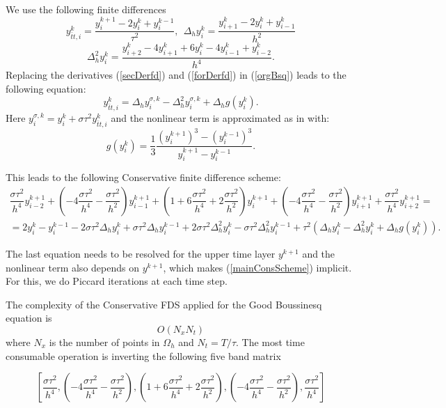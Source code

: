 \documentclass[%
 aip,
cp,  
 amsmath,amssymb,
 reprint,
]{iopconfser}
\newcommand{\rf}[1]{(\ref{#1})}
\begin{document}
We use the following finite differences
\begin{equation}\label{secDerfd}
y_{\bar{t}t,i}^k=\dfrac{y_i^{k+1}-2y_i^k+y_i^{k-1}}{\tau^2},~~\Delta_h y_i^k=\dfrac{y_{i+1}^k-2y_i^k+y_{i-1}^k}{h^2}
\end{equation}
\begin{equation}\label{forDerfd}
\Delta_h^2 y_i^k=\dfrac{y_{i+2}^k-4y_{i+1}^k+6y_{i}^k-4y_{i-1}^k+y_{i-2}^k}{h^4}.
\end{equation}
Replacing the derivatives \rf{secDerfd} and \rf{forDerfd} in \rf{orgBsq} leads to the following equation:
\begin{equation}\label{scheme1}
y_{\bar{t}t,i}^k=\Delta_h y_i^{\sigma,k}-\Delta_h^2 y_i^{\sigma,k} +\Delta_h g(y_i^k).
\end{equation}
Here $ y_i^{\sigma,k}= y_i^{k}+\sigma \tau^2 y_{\bar{t}t,i}^k$ and the nonlinear term is approximated as in \cite{consCitat} with:
\begin{equation}\label{nonLin}
g(y_i^k) = \frac{1}{3} \frac{(y_i^{k+1})^3 - (y_i^{k-1})^3}{y_i^{k+1} - y_i^{k-1}}.
\end{equation}

This leads to the following Conservative finite difference scheme:
\begin{eqnarray}\label{mainConsScheme}
\dfrac{\sigma\tau^2}{h^4}y_{i-2}^{k+1}+\left(-4\dfrac{\sigma\tau^2}{h^4}-\dfrac{\sigma\tau^2}{h^2}\right)y_{i-1}^{k+1}+\left(1+6\dfrac{\sigma\tau^2}{h^4}+2\dfrac{\sigma\tau^2}{h^2}\right)y_{i}^{k+1}+\left(-4\dfrac{\sigma\tau^2}{h^4}-\dfrac{\sigma\tau^2}{h^2}\right)y_{i+1}^{k+1}+\dfrac{\sigma\tau^2}{h^4}y_{i+2}^{k+1}=\nonumber\\
=2y_i^k-y_i^{k-1}-2\sigma\tau^2\Delta_h y_i^k+\sigma\tau^2\Delta_hy_i^{k-1}+2\sigma\tau^2\Delta_h^2y_i^k-\sigma\tau^2\Delta_h^2y_i^{k-1}+\tau^2\left(\Delta_hy_i^k-\Delta_h^2y_i^k+\Delta_h g(y_i^k)\right).
\end{eqnarray}

The last equation needs to be resolved for the upper time layer $y^{k+1}$ and the nonlinear term also depends on $y^{k+1}$, which makes \rf{mainConsScheme} implicit. For this, we do Piccard iterations at each time step.

The complexity of the Conservative FDS applied for the Good Boussinesq equation is
$$ O( N_x  N_t ) $$
where $N_x$ is the number of points in $\Omega_h$ and $N_t = T/\tau$. The most time consumable operation is inverting the following five band matrix 

$$\left[ \dfrac{\sigma\tau^2}{h^4}, \left(-4\dfrac{\sigma\tau^2}{h^4}-\dfrac{\sigma\tau^2}{h^2}\right), \left(1+6\dfrac{\sigma\tau^2}{h^4}+2\dfrac{\sigma\tau^2}{h^2}\right), \left(-4\dfrac{\sigma\tau^2}{h^4}-\dfrac{\sigma\tau^2}{h^2}\right), \dfrac{\sigma\tau^2}{h^4} \right]$$
\end{document}
